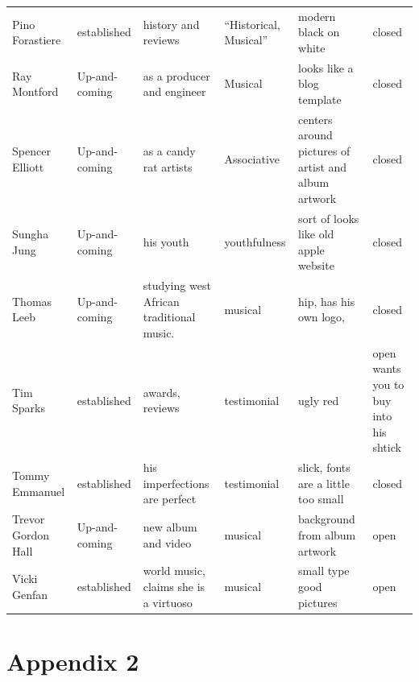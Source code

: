\documentclass[unicode,hyperfootnotes=false,xetex,colorlinks=true,nofonts,nobib]{tufte-handout}
\begin{document}
\begin{longtable}{p{} p{} p{} p{} p{} p{}}
Pino Forastiere & established & history and reviews & ``Historical, Musical'' & modern black on white & closed\\
Ray Montford & Up-and-coming & as a producer and engineer & Musical & looks like a blog template & closed\\
Spencer Elliott & Up-and-coming & as a candy rat artists & Associative & centers around pictures of artist and album artwork & closed\\
Sungha Jung & Up-and-coming & his youth & youthfulness & sort of looks like old apple website & closed\\
Thomas Leeb & Up-and-coming & studying west African traditional music.  & musical & hip, has his own logo,  & closed\\
Tim Sparks & established & awards, reviews & testimonial & ugly red & open wants you to buy into his shtick\\
Tommy Emmanuel & established & his imperfections are perfect & testimonial & slick, fonts are a little too small & closed\\
Trevor Gordon Hall & Up-and-coming & new album and video & musical & background from album artwork & open\\
Vicki Genfan & established & world music, claims she is a virtuoso & musical & small type good pictures & open\\
\end{longtable}
\clearpage
\section{Appendix 2}
\label{sec:appendix-2}
\end{document}
